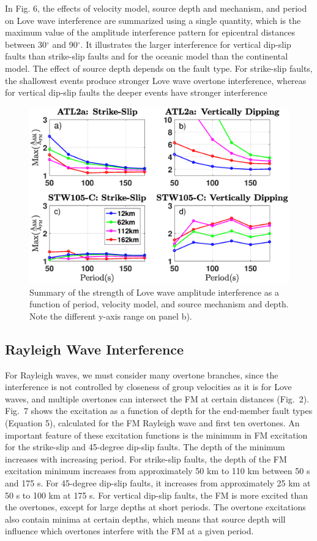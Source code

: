 \documentclass[extra,mreferee]{gji}
\begin{document}
 
In Fig. 6, the effects of velocity model, source depth and mechanism, and period on Love wave interference are summarized using a single quantity, which is the maximum value of the amplitude interference pattern for epicentral distances between 30$^\circ$ and 90$^\circ$. It illustrates the larger interference for vertical dip-slip faults than strike-slip faults and for the oceanic model than the continental model. The effect of source depth depends on the fault type. For strike-slip faults, the shallowest events produce stronger Love wave overtone interference, whereas for vertical dip-slip faults the deeper events have stronger interference
 
  \begin{figure}
 \includegraphics[width=1.0\textwidth]{Fig6_Sver.eps}
 \caption{Summary of the strength of Love wave amplitude interference as a function of period, velocity model, and source mechanism and depth. Note the different y-axis range on panel b). }
 \end{figure}

\subsection{Rayleigh Wave Interference}

 For Rayleigh waves, we must consider many overtone branches, since the interference is not controlled by closeness of group velocities as it is for Love waves, and multiple overtones can intersect the FM at certain distances (Fig.\ 2). Fig.\ 7 shows the excitation as a function of depth for the end-member fault types (Equation 5), calculated for the FM Rayleigh wave and first ten overtones. An important feature of these excitation functions is the minimum in FM excitation for the strike-slip and 45-degree dip-slip faults. The depth of the minimum increases with increasing period. For strike-slip faults, the depth of the FM excitation minimum increases from approximately 50 km to 110 km between 50 s and 175 s. For 45-degree dip-slip faults, it increases from approximately 25 km at 50 s to 100 km at 175 s. For vertical dip-slip faults, the FM is more excited than the overtones, except for large depths at short periods. The  overtone excitations also contain minima at certain depths, which means that source depth will influence which overtones interfere with the FM at a given period.  
 
\end{document}
